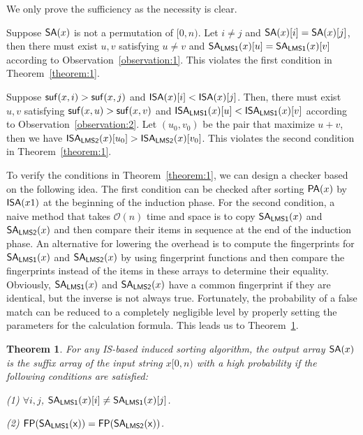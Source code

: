 \documentclass[10pt,journal,compsoc]{IEEEtran}
\newtheorem{theorem}{Theorem}[section]
\begin{document}
\begin{IEEEproof} \label{proof:2}
	We only prove the sufficiency as the necessity is clear.
	
	Suppose ${\sf SA}(x)$ is not a permutation of $[0, n)$. Let $i \ne j$ and ${\sf SA}(x)[i] = {\sf SA}(x)[j]$, then there must exist $u, v$ satisfying $u \ne v$ and ${\sf SA_{LMS1}}(x)[u] = {\sf SA_{LMS1}}(x)[v]$ according to Observation~\ref{observation:1}. This violates the first condition in Theorem~\ref{theorem:1}.
	
	Suppose ${\sf suf}(x, i) > {\sf suf}(x, j)$ and ${\sf ISA}(x)[i] < {\sf ISA}(x)[j]$. Then, there must exist $u, v$ satisfying ${\sf suf}(x, u) > {\sf suf}(x, v)$ and ${\sf ISA_{LMS1}}(x)[u] < {\sf ISA_{LMS1}}(x)[v]$ according to Observation~\ref{observation:2}. Let $(u_0, v_0)$ be the pair that maximize $u + v$, then we have ${\sf ISA_{LMS2}}(x)[u_0] > {\sf ISA_{LMS2}}(x)[v_0]$. This violates the second condition in Theorem~\ref{theorem:1}.
\end{IEEEproof}

To verify the conditions in Theorem~\ref{theorem:1}, we can design a checker based on the following idea. The first condition can be checked after sorting ${\sf PA}(x)$ by ${\sf ISA}(x1)$ at the beginning of the induction phase. For the second condition, a naive method that takes $\mathcal{O}(n)$ time and space is to copy ${\sf SA_{LMS1}}(x)$ and ${\sf SA_{LMS2}}(x)$ and then compare their items in sequence at the end of the induction phase. An alternative for lowering the overhead is to compute the fingerprints for ${\sf SA_{LMS1}}(x)$ and ${\sf SA_{LMS2}}(x)$ by using fingerprint functions and then compare the fingerprints instead of the items in these arrays to determine their equality. Obviously, ${\sf SA_{LMS1}}(x)$ and ${\sf SA_{LMS2}}(x)$ have a common fingerprint if they are identical, but the inverse is not always true. Fortunately, the probability of a false match can be reduced to a completely negligible level by properly setting the parameters for the calculation formula. This leads us to Theorem~\ref{theorem:2}.

\begin{theorem} \label{theorem:2}
	For any IS-based induced sorting algorithm, the output array ${\sf SA}(x)$ is the suffix array of the input string $x[0, n)$ with a high probability if the following conditions are satisfied:
	
	(1) $\forall i, j$, ${\sf SA_{LMS1}}(x)[i] \ne {\sf SA_{LMS1}}(x)[j]$.
	
	(2) ${\sf FP(SA_{LMS1}(x))} = {\sf FP(SA_{LMS2}(x))}$.
\end{theorem}
\end{document}
